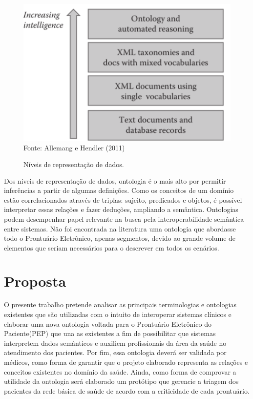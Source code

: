  \begin{figure}[htbp]
    	\centering
        \caption{Níveis de representação de dados.}
        \label{fig:nivel-dados.png}
        \includegraphics[width=1\linewidth]{nivel-dados.png}
        Fonte:  Allemang e Hendler (2011) 
\end{figure}



Dos níveis de representação de dados, ontologia é o mais alto por permitir inferências a partir de algumas definições. Como os conceitos de um domínio estão correlacionados através de triplas: sujeito, predicados e objetos, é possível interpretar essas relações e fazer deduções, ampliando a semântica.
Ontologias podem desempenhar papel relevante
na busca pela interoperabilidade semântica entre sistemas\cite{INTEROPENEHR}. Não foi encontrada na literatura uma ontologia que abordasse todo o Prontuário Eletrônico, apenas segmentos, devido ao grande volume de elementos que seriam necessários para o descrever em todos os cenários.
\section{Proposta}

O presente trabalho pretende analisar as principais terminologias e ontologias existentes que são utilizadas com o intuito de interoperar sistemas clínicos e elaborar uma nova ontologia voltada para o Prontuário Eletrônico do Paciente(PEP) que una as existentes a fim de possibilitar que sistemas interpretem dados semânticos e auxiliem profissionais da área da saúde no atendimento dos pacientes.
Por fim, essa ontologia deverá ser validada por médicos, como forma de garantir que o projeto elaborado representa as relações e conceitos existentes no domínio da saúde. Ainda, como forma de comprovar a utilidade da ontologia será elaborado um protótipo que gerencie a triagem dos pacientes da rede básica de saúde de acordo com a criticidade de cada prontuário.



